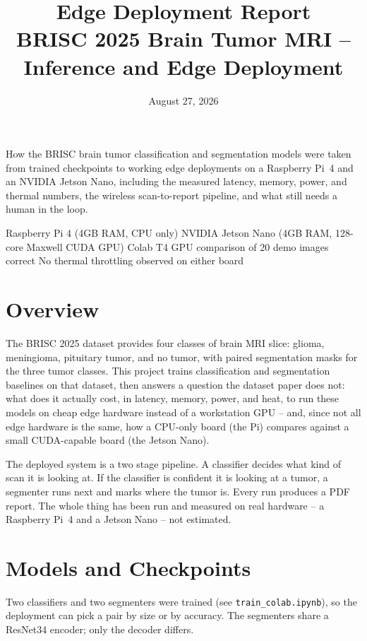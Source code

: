 \documentclass[11pt]{article}
\title{\textbf{\Large Edge Deployment Report}\\[4pt]
\large BRISC 2025 Brain Tumor MRI -- Inference and Edge Deployment}
\author{}
\date{August 27, 2026}
\begin{document}
\maketitle
\thispagestyle{fancy}

\noindent How the BRISC brain tumor classification and segmentation models were taken from
trained checkpoints to working edge deployments on a Raspberry Pi~4 and an NVIDIA
Jetson Nano, including the measured latency, memory, power, and thermal numbers, the
wireless scan-to-report pipeline, and what still needs a human in the loop.

\begin{tcolorbox}[colback=lightgray, colframe=accent, boxrule=0.4pt, arc=1pt]
\small Raspberry Pi 4 (4GB RAM, CPU only) \;\textbullet\; NVIDIA Jetson Nano (4GB RAM,
128-core Maxwell CUDA GPU) \;\textbullet\; Colab T4 GPU comparison \;\textbullet{} of 20 demo images correct \;\textbullet\; No thermal throttling observed on either board
\end{tcolorbox}

\section{Overview}

The BRISC 2025 dataset provides four classes of brain MRI slice: glioma, meningioma,
pituitary tumor, and no tumor, with paired segmentation masks for the three tumor
classes. This project trains classification and segmentation baselines on that dataset,
then answers a question the dataset paper does not: what does it actually cost, in
latency, memory, power, and heat, to run these models on cheap edge hardware instead of
a workstation GPU -- and, since not all edge hardware is the same, how a CPU-only board
(the Pi) compares against a small CUDA-capable board (the Jetson Nano).

The deployed system is a two stage pipeline. A classifier decides what kind of scan it
is looking at. If the classifier is confident it is looking at a tumor, a segmenter runs
next and marks where the tumor is. Every run produces a PDF report. The whole thing has
been run and measured on real hardware -- a Raspberry Pi~4 and a Jetson Nano -- not
estimated.

\section{Models and Checkpoints}

Two classifiers and two segmenters were trained (see \texttt{train\_colab.ipynb}), so
the deployment can pick a pair by size or by accuracy. The segmenters share a ResNet34
encoder; only the decoder differs.
\end{document}
